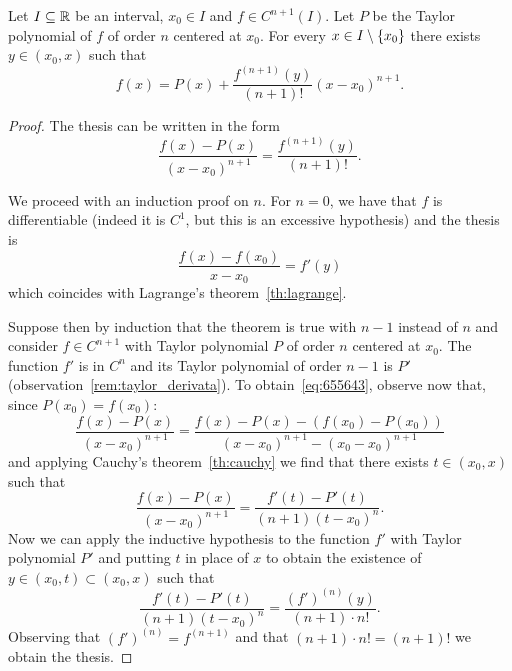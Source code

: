 \begin{theorem}
\label{th:taylor_lagrange}%
\mymark{**}%
%
%
Let $I\subseteq {\mathbb R}$ be an interval, $x_0\in I$
and $f\in C^{n+1}(I)$.
Let $P$ be the Taylor polynomial of $f$ of order $n$ centered at $x_0$.
For every $x\in I\setminus{\left\{ x_0 \right\}}$ there exists $y\in (x_0,x)$
such that
\[
  f(x) = P(x) + \frac{f^{(n+1)}(y)}{(n+1)!}(x-x_0)^{n+1}.
\]
\end{theorem}
%
\begin{proof}\mymark{*}%
The thesis can be written in the form 
\[
  \frac{f(x) - P(x)}{(x-x_0)^{n+1}} 
  = \frac{f^{(n+1)}(y)}{(n+1)!}.
\]

We proceed with an induction proof on $n$. 
For $n=0$, we have that $f$ is differentiable (indeed it is $C^1$, but this is
an
excessive hypothesis) and the thesis is
\begin{equation}\label{eq:655643}
  \frac{f(x) - f(x_0)}{x-x_0}  = f'(y)  
\end{equation}
which coincides with Lagrange's theorem~\ref{th:lagrange}.

Suppose then by induction 
that the theorem is true with $n-1$ instead of 
$n$ and consider $f\in C^{n+1}$ with Taylor polynomial $P$
of order $n$ centered at $x_0$. 
The function $f'$ is in $C^{n}$ and its Taylor polynomial 
of order $n-1$ is $P'$ (observation~\ref{rem:taylor_derivata}).
To obtain~\eqref{eq:655643}, observe now that, since $P(x_0)=f(x_0)$:
\[
  \frac{f(x)-P(x)}{(x-x_0)^{n+1}}  
  = \frac{f(x) - P(x) - (f(x_0)-P(x_0))}{(x-x_0)^{n+1} - (x_0-x_0)^{n+1}}
\]
and applying Cauchy's theorem~\ref{th:cauchy}
we find that there exists $t\in (x_0,x)$ such that
\[
  \frac{f(x)-P(x)}{(x-x_0)^{n+1}}  
  = \frac{f'(t)-P'(t)}{(n+1)(t-x_0)^n}. 
\]
Now we can apply the inductive hypothesis to the function 
$f'$ with Taylor polynomial $P'$
and putting $t$ in place of $x$ to obtain 
the existence of $y\in (x_0,t)\subset(x_0,x)$ such that 
\[
  \frac{f'(t)-P'(t)}{(n+1)(t-x_0)^n}
  = \frac{(f')^{(n)}(y)}{(n+1)\cdot n!}.
\]
Observing that $(f')^{(n)} = f^{(n+1)}$ and that $(n+1)\cdot n!=(n+1)!$ 
we obtain the thesis.
\end{proof}

